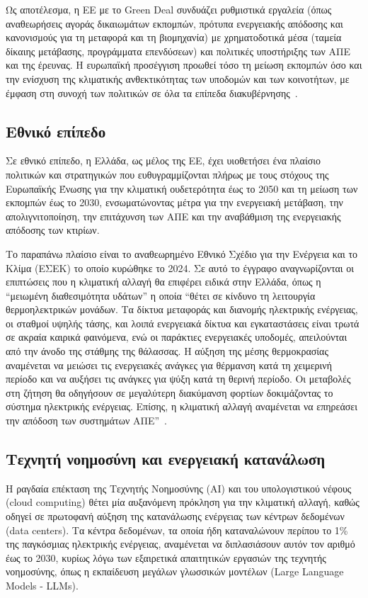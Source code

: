 Ως αποτέλεσμα, η ΕΕ με το Green Deal συνδυάζει ρυθμιστικά εργαλεία (όπως αναθεωρήσεις αγοράς δικαιωμάτων εκπομπών, πρότυπα ενεργειακής απόδοσης και κανονισμούς για τη μεταφορά και τη βιομηχανία) με χρηματοδοτικά μέσα (ταμεία δίκαιης μετάβασης, προγράμματα επενδύσεων) και πολιτικές υποστήριξης των ΑΠΕ και της έρευνας. Η ευρωπαϊκή προσέγγιση προωθεί τόσο τη μείωση εκπομπών όσο και την ενίσχυση της κλιματικής ανθεκτικότητας των υποδομών και των κοινοτήτων, με έμφαση στη συνοχή των πολιτικών σε όλα τα επίπεδα διακυβέρνησης~\cite{sikora2020}.

\subsection{Εθνικό επίπεδο}
\label{subsec:national-level}

Σε εθνικό επίπεδο, η Ελλάδα, ως μέλος της ΕΕ, έχει υιοθετήσει ένα πλαίσιο πολιτικών και στρατηγικών που ευθυγραμμίζονται πλήρως με τους στόχους της Ευρωπαϊκής Ένωσης για την κλιματική ουδετερότητα έως το 2050 και τη μείωση των εκπομπών έως το 2030, ενσωματώνοντας μέτρα για την ενεργειακή μετάβαση, την απολιγνιτοποίηση, την επιτάχυνση των ΑΠΕ και την αναβάθμιση της ενεργειακής απόδοσης των κτιρίων.

Το παραπάνω πλαίσιο είναι το αναθεωρημένο Εθνικό Σχέδιο για την Ενέργεια και το Κλίμα (ΕΣΕΚ) το οποίο κυρώθηκε το 2024. Σε αυτό το έγγραφο αναγνωρίζονται οι επιπτώσεις που η κλιματική αλλαγή θα επιφέρει ειδικά στην Ελλάδα, όπως η ``μειωμένη διαθεσιμότητα υδάτων'' η οποία ``θέτει σε κίνδυνο τη λειτουργία θερμοηλεκτρικών μονάδων. Τα δίκτυα μεταφοράς και διανομής ηλεκτρικής ενέργειας, οι σταθμοί υψηλής τάσης, και λοιπά ενεργειακά δίκτυα και εγκαταστάσεις είναι τρωτά σε ακραία καιρικά φαινόμενα, ενώ οι παράκτιες ενεργειακές υποδομές, απειλούνται από την άνοδο της στάθμης της θάλασσας. Η αύξηση της μέσης θερμοκρασίας αναμένεται να μειώσει τις ενεργειακές ανάγκες για θέρμανση κατά τη χειμερινή περίοδο και να αυξήσει τις ανάγκες για ψύξη κατά τη θερινή περίοδο. Οι μεταβολές στη ζήτηση θα οδηγήσουν σε μεγαλύτερη διακύμανση φορτίων δοκιμάζοντας το σύστημα ηλεκτρικής ενέργειας. Επίσης, η κλιματική αλλαγή αναμένεται να επηρεάσει την απόδοση των συστημάτων ΑΠΕ''~\cite{esek2024}.

\subsection{Τεχνητή νοημοσύνη και ενεργειακή κατανάλωση}
\label{subsec:ai-energy}

Η ραγδαία επέκταση της Τεχνητής Νοημοσύνης (AI) και του υπολογιστικού νέφους (cloud computing) θέτει μία αυξανόμενη πρόκληση για την κλιματική αλλαγή, καθώς οδηγεί σε πρωτοφανή αύξηση της κατανάλωσης ενέργειας των κέντρων δεδομένων (data centers). Τα κέντρα δεδομένων, τα οποία ήδη καταναλώνουν περίπου το 1\% της παγκόσμιας ηλεκτρικής ενέργειας, αναμένεται να διπλασιάσουν αυτόν τον αριθμό έως το 2030, κυρίως λόγω των εξαιρετικά απαιτητικών εργασιών της τεχνητής νοημοσύνης, όπως η εκπαίδευση μεγάλων γλωσσικών μοντέλων (Large Language Models - LLMs). 

